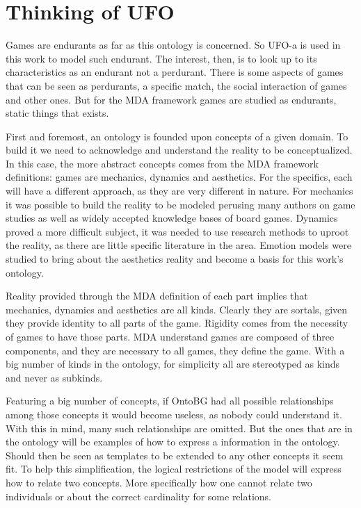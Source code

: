 \section{Thinking of UFO} 


Games are endurants as far as this ontology is concerned. So UFO-a is used in this work to model such endurant. The interest, then, is to look up to its characteristics as an endurant not a perdurant. There is some aspects of games that can be seen as perdurants, a specific match, the social interaction of games and other ones. But for the MDA framework games are studied as endurants, static things that exists.

First and foremost, an ontology is founded upon concepts of a given domain. To build it we need to acknowledge and understand the reality to be conceptualized. In this case, the more abstract concepts comes from the MDA framework definitions: games are mechanics, dynamics and aesthetics. For the specifics, each will have a different approach, as they are very different in nature. For mechanics it was possible to build the reality to be modeled perusing many authors on game studies as well as widely accepted knowledge bases of board games. Dynamics proved a more difficult subject, it was needed to use research methods to uproot the reality, as there are little specific literature in the area. Emotion models were studied to bring about the aesthetics reality and become a basis for this work's ontology.

Reality provided through the MDA definition of each part implies that mechanics, dynamics and aesthetics are all kinds. Clearly they are sortals, given they provide identity to all parts of the game. Rigidity comes from the necessity of games to have those parts. MDA understand games are composed of three components, and they are necessary to all games, they define the game. With a big number of kinds in the ontology, for simplicity all are stereotyped as kinds and never as subkinds.

Featuring a big number of concepts, if OntoBG had all possible relationships among those concepts it would become useless, as nobody could understand it. With this in mind, many such relationships are omitted. But the ones that are in the ontology will be examples of how to express a information in the ontology. Should then be seen as templates to be extended to any other concepts it seem fit. To help this simplification, the logical restrictions of the model will express how to relate two concepts. More specifically how one cannot relate two individuals or about the correct cardinality for some relations. 

